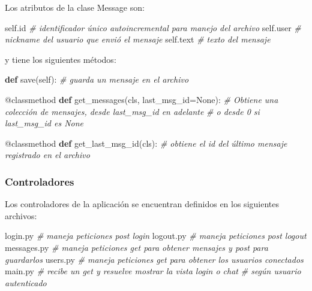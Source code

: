 \documentclass[12pt]{extarticle}
\newenvironment{Shaded}{}{}
\newcommand{\KeywordTok}[1]{\textcolor[rgb]{0.00,0.44,0.13}{\textbf{{#1}}}}
\newcommand{\CommentTok}[1]{\textcolor[rgb]{0.38,0.63,0.69}{\textit{{#1}}}}
\newcommand{\NormalTok}[1]{{#1}}
\newcommand{\VariableTok}[1]{\textcolor[rgb]{0.10,0.09,0.49}{{#1}}}
\newcommand{\OperatorTok}[1]{\textcolor[rgb]{0.40,0.40,0.40}{{#1}}}
\newcommand{\BuiltInTok}[1]{{#1}}
\newcommand{\AttributeTok}[1]{\textcolor[rgb]{0.49,0.56,0.16}{{#1}}}
\begin{document}
Los atributos de la clase Message son:

\begin{Shaded}
\begin{Highlighting}[]
\VariableTok{self}\NormalTok{.}\BuiltInTok{id} \CommentTok{# identificador único autoincremental para manejo del archivo}
\VariableTok{self}\NormalTok{.user }\CommentTok{# nickname del usuario que envió el mensaje}
\VariableTok{self}\NormalTok{.text }\CommentTok{# texto del mensaje}
\end{Highlighting}
\end{Shaded}

y tiene los siguientes métodos:

\begin{Shaded}
\begin{Highlighting}[]
\KeywordTok{def}\NormalTok{ save(}\VariableTok{self}\NormalTok{):}
\CommentTok{# guarda un mensaje en el archivo}

\AttributeTok{@classmethod}
\KeywordTok{def}\NormalTok{ get_messages(cls, last_msg_id}\OperatorTok{=}\VariableTok{None}\NormalTok{):}
\CommentTok{# Obtiene una colección de mensajes, desde last_msg_id en adelante }
\CommentTok{# o desde 0 si last_msg_id es None}

\AttributeTok{@classmethod}
\KeywordTok{def}\NormalTok{ get_last_msg_id(cls):}
\CommentTok{# obtiene el id del último mensaje registrado en el archivo}
\end{Highlighting}
\end{Shaded}

\subsubsection{Controladores}\label{controladores-1}

Los controladores de la aplicación se encuentran definidos en los
siguientes archivos:

\begin{Shaded}
\begin{Highlighting}[]
\NormalTok{login.py }
\CommentTok{# maneja peticiones post login}
\NormalTok{logout.py }
\CommentTok{# maneja peticiones post logout}
\NormalTok{messages.py }
\CommentTok{# maneja peticiones get para obtener mensajes y post para guardarlos}
\NormalTok{users.py }
\CommentTok{# maneja peticiones get para obtener los usuarios conectados}
\NormalTok{main.py }
\CommentTok{# recibe un get y resuelve mostrar la vista login o chat }
\CommentTok{# según usuario autenticado }
\end{Highlighting}
\end{Shaded}
\end{document}
